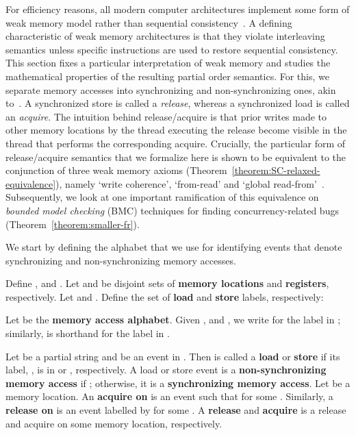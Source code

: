 \documentclass{llncs}
\newcommand{\defn}[1]{\textbf{#1}}
\begin{document}
For efficiency reasons, all modern computer architectures implement some form of weak memory model rather than sequential consistency~\cite{L1979}. A defining characteristic of weak memory architectures is that they violate interleaving semantics unless specific instructions are used to restore sequential consistency. This section fixes a particular interpretation of weak memory and studies the mathematical properties of the resulting partial order semantics. For this, we separate memory accesses into synchronizing and non-synchronizing ones, akin to~\cite{GLLGGH1990}. A synchronized store is called a \emph{release}, whereas a synchronized load is called an \emph{acquire}. The intuition behind release/acquire is that prior writes made to other memory locations by the thread executing the release become visible in the thread that performs the corresponding acquire. Crucially, the particular form of release/acquire semantics that we formalize here is shown to be equivalent to the conjunction of three weak memory axioms (Theorem~\ref{theorem:SC-relaxed-equivalence}), namely `write coherence', `from-read' and `global read-from'~\cite{AMSS2012}. Subsequently, we look at one important ramification of this equivalence on \emph{bounded model checking} (BMC) techniques for finding concurrency-related bugs (Theorem~\ref{theorem:smaller-fr}).

We start by defining the alphabet that we use for identifying events that denote synchronizing and non-synchronizing memory accesses.

\newcommand{\memorylocation}{\langle\textit{ADDRESS}\rangle}
\newcommand{\register}{\langle\textit{REG}\rangle}
\newcommand{\loadmemoryorder}{\langle\textit{LOAD}\rangle}
\newcommand{\storememoryorder}{\langle\textit{STORE}\rangle}
\newcommand{\bit}{\langle\textit{BIT}\rangle}

\begin{definition}
\label{def:memory-access-alphabet}
Define ,  and . Let  and  be disjoint sets of \defn{memory locations} and \defn{registers}, respectively. Let  and . Define the set of \defn{load} and \defn{store} labels, respectively:
\label{def:alphabet}

Let  be the \defn{memory access alphabet}. Given ,  and , we write  for the label  in ; similarly,  is shorthand for the label  in .

Let  be a partial string and  be an event in . Then  is called a \defn{load} or \defn{store} if its label, , is in  or , respectively. A load or store event  is a \defn{non-synchronizing memory access} if ; otherwise, it is a \defn{synchronizing memory access}. Let  be a memory location. An \defn{acquire on } is an event  such that  for some . Similarly, a \defn{release on } is an event  labelled by  for some . A \defn{release} and \defn{acquire} is a release and acquire on some memory location, respectively.
\end{definition}
\end{document}
